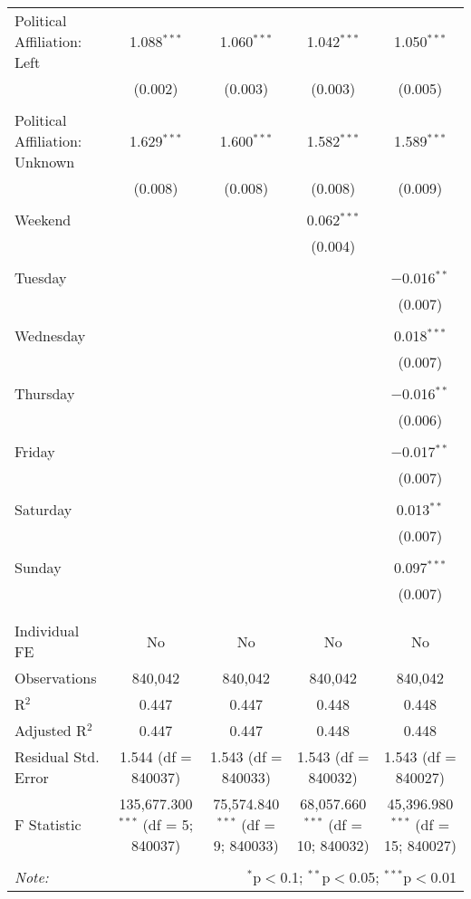 \documentclass[
]{article}
\begin{document}
\begin{table}[!htbp]
{\begin{tabular}{@{\extracolsep{5pt}}lcccc}
 Political Affiliation: Left & 1.088$^{***}$ & 1.060$^{***}$ & 1.042$^{***}$ & 1.050$^{***}$ \\ 
  & (0.002) & (0.003) & (0.003) & (0.005) \\ 
  & & & & \\ 
 Political Affiliation: Unknown & 1.629$^{***}$ & 1.600$^{***}$ & 1.582$^{***}$ & 1.589$^{***}$ \\ 
  & (0.008) & (0.008) & (0.008) & (0.009) \\ 
  & & & & \\ 
 Weekend &  &  & 0.062$^{***}$ &  \\ 
  &  &  & (0.004) &  \\ 
  & & & & \\ 
 Tuesday &  &  &  & $-$0.016$^{**}$ \\ 
  &  &  &  & (0.007) \\ 
  & & & & \\ 
 Wednesday &  &  &  & 0.018$^{***}$ \\ 
  &  &  &  & (0.007) \\ 
  & & & & \\ 
 Thursday &  &  &  & $-$0.016$^{**}$ \\ 
  &  &  &  & (0.006) \\ 
  & & & & \\ 
 Friday &  &  &  & $-$0.017$^{**}$ \\ 
  &  &  &  & (0.007) \\ 
  & & & & \\ 
 Saturday &  &  &  & 0.013$^{**}$ \\ 
  &  &  &  & (0.007) \\ 
  & & & & \\ 
 Sunday &  &  &  & 0.097$^{***}$ \\ 
  &  &  &  & (0.007) \\ 
  & & & & \\ 
\hline \\[-1.8ex] 
Individual FE & No & No & No & No \\ 
Observations & 840,042 & 840,042 & 840,042 & 840,042 \\ 
R$^{2}$ & 0.447 & 0.447 & 0.448 & 0.448 \\ 
Adjusted R$^{2}$ & 0.447 & 0.447 & 0.448 & 0.448 \\ 
Residual Std. Error & 1.544 (df = 840037) & 1.543 (df = 840033) & 1.543 (df = 840032) & 1.543 (df = 840027) \\ 
F Statistic & 135,677.300$^{***}$ (df = 5; 840037) & 75,574.840$^{***}$ (df = 9; 840033) & 68,057.660$^{***}$ (df = 10; 840032) & 45,396.980$^{***}$ (df = 15; 840027) \\ 
\hline 
\hline \\[-1.8ex] 
\textit{Note:}  & \multicolumn{4}{r}{$^{*}$p$<$0.1; $^{**}$p$<$0.05; $^{***}$p$<$0.01} \\ 
\end{tabular}
} 
\end{table} 
\newpage
\end{document}
